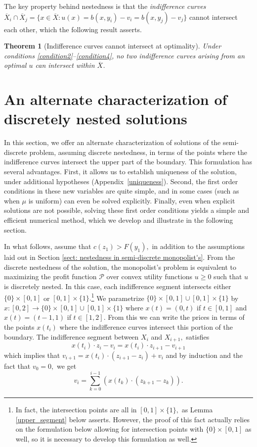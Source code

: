 \documentclass[12pt,reqno]{amsart}
\newtheorem{theorem}{Theorem}
\begin{document}
The key property behind nestedness is that the \emph{indifference curves} $\overline X_i \cap \overline X_j=\{x\in \overline{X}: u(x)=b(x,y_i)-v_i=b(x,y_j)-v_j\}$ cannot intersect each other, which the following result asserts.

\begin{theorem}[Indifference curves cannot intersect at optimality]\label{thm: no intersection}
    Under conditions \ref{condition2}--\ref{condition4}, no two indifference curves arising from an optimal $u$ can intersect within $\overline{X}$.
\end{theorem}

\section{An alternate characterization of discretely nested solutions}
In this section, we offer an alternate characterization of solutions of the semi-discrete problem, assuming discrete nestedness, in terms of the points where the indifference curves intersect the upper part of the boundary.  This formulation has several advantages.  First, it allows us to establish uniqueness of the solution, under additional hypotheses (Appendix~\ref{uniqueness}).  Second, the first order conditions in these new variables are quite simple, and in some cases (such as when $\mu$ is uniform) can even be solved explicitly.  Finally, even when explicit solutions are not possible, solving these first order conditions yields a simple and efficient numerical method, which we develop and illustrate in the following section.

In what follows, assume that $c(z_1)>F(y_1),$ in addition to the assumptions laid out in Section \ref{sect: nestedness in semi-discrete monopolist's}. From the discrete nestedness of the solution, the monopolist's problem is equivalent to maximizing the profit function $\mathcal{P}$ over convex  utility functions $u\ge0$ such that $u$ is discretely nested.
In this case, each indifference segment intersects either $\{0\}\times[0,1]$ or $[0,1]\times\{1\}.$\footnote{In fact, the intersection points are all in $[0,1]\times\{1\},$ as Lemma \ref{upper_segment} below asserts.  However, the proof of this fact actually relies on the formulation below allowing for intersection points with $\{0\}\times[0,1]$ as well, so it is necessary to develop this formulation as well.} We parametrize $\{0\}\times[0,1]\cup[0,1]\times\{1\}$ by $x:[0,2]\to\{0\}\times[0,1]\cup[0,1]\times\{1\}$ where $x(t)=(0,t)$ if $t\in[0,1]$ and $x(t)=(t-1,1)$ if $t\in[1,2].$ From this we can write the prices in terms of the points $x(t_i)$ where the indifference curves intersect this portion of the boundary. The  indifference segment between $ X_i$ and $ X_{i+1},$ satisfies
\[x(t_i)\cdot z_i-v_i=x(t_i)\cdot z_{i+1}-v_{i+1}\]
which implies that $v_{i+1}=x(t_i)\cdot(z_{i+1}-z_i)+v_i$ and by induction and the fact that $v_0=0,$ we get 
\[v_i=\sum_{k=0}^{i-1}(x(t_{k})\cdot (z_{k+1}-z_{k})).\]
\end{document}
